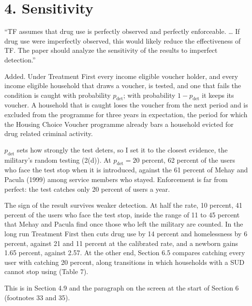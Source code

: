 \documentclass[11pt]{article}
\begin{document}
\section*{4. Sensitivity}

\begin{referee}
``TF assumes that drug use is perfectly observed and perfectly enforceable. \dots
If drug use were imperfectly observed, this would likely reduce the effectiveness
of TF. The paper should analyze the sensitivity of the results to imperfect
detection.''
\end{referee}
\begin{response}
Added. Under Treatment First every income eligible voucher holder, and every
income eligible household that draws a voucher, is tested, and one that fails the
condition is caught with probability $p_{\mathrm{det}}$; with probability
$1-p_{\mathrm{det}}$ it keeps its voucher. A household that is caught loses the voucher from the next
period and is excluded from the programme for three years in expectation, the
period for which the Housing Choice Voucher programme already bars a household
evicted for drug related criminal activity.

$p_{\mathrm{det}}$ sets how strongly the test deters, so I set it to the closest
evidence, the military's random testing (2(d)). At $p_{\mathrm{det}}=20$ percent,
62 percent of the users who face the test stop when it is introduced, against the
61 percent of Mehay and Pacula (1999) among service members who stayed.
Enforcement is far from perfect: the test catches only 20 percent of users a year.

The sign of the result survives weaker detection. At half the rate, 10 percent, 41
percent of the users who face the test stop, inside the range of 11 to 45 percent
that Mehay and Pacula find once those who left the military are counted. In the
long run Treatment First then cuts drug use by 14 percent and homelessness by 6
percent, against 21 and 11 percent at the calibrated rate, and a newborn gains
1.65 percent, against 2.57. At the other end, Section 6.5 compares catching every
user with catching 20 percent, along transitions in which households with a SUD
cannot stop using (Table 7).

This is in Section 4.9 and the paragraph on the screen at the start of Section 6
(footnotes 33 and 35).
\end{response}
\end{document}
